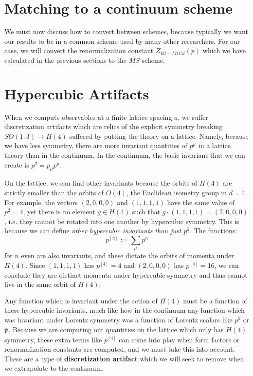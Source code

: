 \documentclass[11pt, oneside]{article}   	%
\theoremstyle{definition}
\begin{document}
\section{Matching to a continuum scheme}

We must now discuss how to convert between schemes, because typically we want our results to be in a common scheme 
used by many other researchers. For our case, we will convert the renormalization constant $Z_{RI-MOM}(p)$ which we 
have calculated in the previous sections to the $\overline{MS}$ scheme. 

\section{Hypercubic Artifacts}
\label{sec:artifacts}

When we compute observables at a finite lattice spacing $a$, we suffer discretization artifacts which are relics of the explicit 
symmetry breaking $SO(1, 3)\rightarrow H(4)$ suffered by putting the theory on a lattice. Namely, because we have less 
symmetry, there are more invariant quantities of $p^\mu$ in a lattice theory than in the continuum. In the continuum, the 
basic invariant that we can create is $p^2 = p_\mu p^\mu$. 

On the lattice, we can find other invariants because the orbits of $H(4)$ are strictly smaller than the orbits of 
$O(4)$, the Euclidean isometry group in $d = 4$. For example, the vectors $(2, 0, 0, 0)$ and $(1, 1, 1, 1)$ have the same 
value of $p^2 = 4$, yet there is no element $g\in H(4)$ such that $g\cdot (1, 1, 1, 1) = (2, 0, 0, 0)$, i.e. they cannot be 
rotated into one another by hypercubic symmetry. This is because we can define \textit{other hypercubic invariants than 
just $p^2$}. The functions:
\begin{equation}
	p^{[n]} := \sum_\mu p^n
\end{equation}
for $n$ even are also invariants, and these dictate the orbits of momenta under $H(4)$. Since $(1, 1, 1, 1)$ has 
$p^{[4]} = 4$ and $(2, 0, 0, 0)$ has $p^{[4]} = 16$, we can conclude they are distinct momenta under hypercubic 
symmetry and thus cannot live in the same orbit of $H(4)$. 

Any function which is invariant under the action of $H(4)$ must be a function of these hypercubic invariants, much like 
how in the continuum any function which was invariant under Lorentz symmetry was a function of Lorentz scalars like 
$p^2$ or $\slashed p$. Because we are computing out quantities on the lattice which only has $H(4)$ symmetry, these 
extra terms like $p^{[4]}$ can come into play when form factors or renormalization constants are computed, and we must 
take this into account. These are a type of \textbf{discretization artifact} which we will seek to remove when we extrapolate 
to the continuum. 
\end{document}
